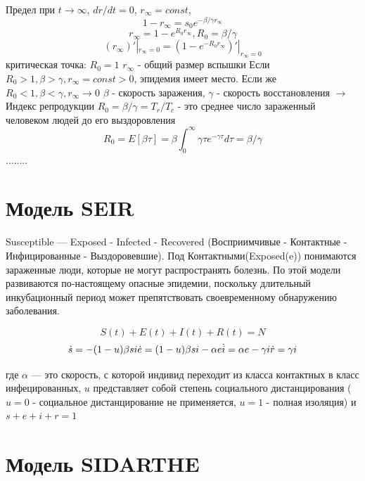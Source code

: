 Предел при $ t \rightarrow \infty $, $ dr/dt = 0$, $r_\infty = const$,
$$ 1 -r_\infty = s_0 e^{-\beta/\gamma r_\infty}$$
$$ r_\infty = 1- e^{R_0 r_\infty}, R_0 = \beta/\gamma$$
$$(r_\infty)'|_{r_\infty=0} = (1 - e^{-R_0 r_\infty})'|_{r_\infty =0}$$
критическая точка: $R_0 = 1$
$r_\infty$ - общий размер вспышки
Если $R_0 > 1, \beta > \gamma , r_\infty = const>0$, эпидемия имеет место.
Если же $ R_0 < 1, \beta < \gamma , r_\infty \rightarrow 0$
$\beta$ - скорость заражения, $\gamma$ - скорость восстановления $\rightarrow$
Индекс репродукции $R_0 = \beta/\gamma = T_r/T_c$ - это среднее число зараженный человеком людей до его выздоровления
$$R_0 = E[\beta\tau] = \beta \int_0^\infty \gamma\tau e^{-\gamma\tau} d\tau =\beta/\gamma$$
........


\section{Модель SEIR}\label{1sec:SEIR}
Susceptible — Exposed - Infected - Recovered (Восприимчивые - Контактные - Инфицированные - Выздоровевшие).
Под Контактными(Exposed(e)) понимаются зараженные люди, которые не могут распространять болезнь.
По этой модели развиваются по-настоящему опасные эпидемии, поскольку длительный инкубационный период может препятствовать своевременному обнаружению заболевания.

$$S(t) + E(t) + I(t) + R(t) = N$$
\begin{equation*}
    \dot{s} = -(1 - u)\beta si
    $$ $$
    \dot{e} = (1 - u)\beta si -\alpha e
    $$ $$
    \dot{i}= \alpha e - \gamma i
    $$ $$
    \dot{r} = \gamma i
\end{equation*}

где $\alpha$ --- это скорость, с которой индивид переходит из
класса контактных в класс инфецированных, $u$ представляет собой степень социального дистанцирования ($u = 0$ - социальное дистанцирование не применяется, $u = 1$ - полная изоляция) и $ s + e + i + r = 1$


\section{Модель SIDARTHE}\label{1sec:SIDARTHE}

